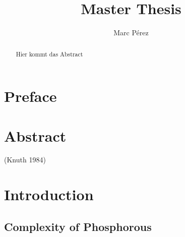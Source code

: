 \documentclass[
  letterpaper,
  DIV=11,
  numbers=noendperiod]{scrartcl}
\title{Master Thesis}
\author{Marc Pérez}
\date{}
\begin{document}
\maketitle
\begin{abstract}
Hier kommt das Abstract
\end{abstract}


\section{Preface}\label{preface}

\section{Abstract}\label{abstract}

(Knuth 1984)

\section{Introduction}\label{introduction}

\subsection{Complexity of Phosphorous}\label{complexity-of-phosphorous}
\end{document}
